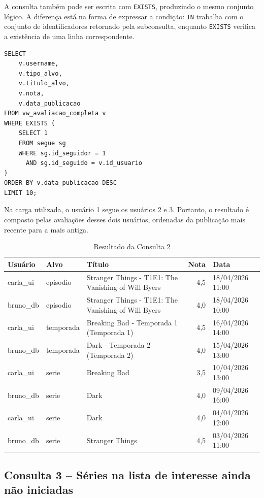 \documentclass[a4paper,12pt,oneside,openany]{book}
\newcommand{\id}[1]{\texttt{#1}}
\begin{document}
A consulta também pode ser escrita com \id{EXISTS}, produzindo o mesmo conjunto
lógico. A diferença está na forma de expressar a condição: \id{IN} trabalha
com o conjunto de identificadores retornado pela subconsulta, enquanto
\id{EXISTS} verifica a existência de uma linha correspondente.

\begin{lstlisting}[caption={Formulação equivalente da Consulta 2 com \id{EXISTS}},label={lst:consulta2-exists}]
SELECT
    v.username,
    v.tipo_alvo,
    v.titulo_alvo,
    v.nota,
    v.data_publicacao
FROM vw_avaliacao_completa v
WHERE EXISTS (
    SELECT 1
    FROM segue sg
    WHERE sg.id_seguidor = 1
      AND sg.id_seguido = v.id_usuario
)
ORDER BY v.data_publicacao DESC
LIMIT 10;
\end{lstlisting}

Na carga utilizada, o usuário 1 segue os usuários 2 e 3. Portanto, o resultado
é composto pelas avaliações desses dois usuários, ordenadas da publicação mais
recente para a mais antiga.

\begin{table}[H]
\centering
\caption{Resultado da Consulta 2}
\label{tab:resultado-consulta2}
\scriptsize
\begin{tabularx}{\textwidth}{@{}l l X r l@{}}
\toprule
\textbf{Usuário} & \textbf{Alvo} & \textbf{Título} & \textbf{Nota} & \textbf{Data} \\
\midrule
carla\_ui & episodio & Stranger Things - T1E1: The Vanishing of Will Byers & 4,5 & 18/04/2026 11:00 \\
bruno\_db & episodio & Stranger Things - T1E1: The Vanishing of Will Byers & 4,0 & 18/04/2026 10:00 \\
carla\_ui & temporada & Breaking Bad - Temporada 1 (Temporada 1) & 4,5 & 16/04/2026 14:00 \\
bruno\_db & temporada & Dark - Temporada 2 (Temporada 2) & 4,0 & 15/04/2026 13:00 \\
carla\_ui & serie & Breaking Bad & 3,5 & 10/04/2026 13:00 \\
bruno\_db & serie & Dark & 4,0 & 09/04/2026 16:00 \\
carla\_ui & serie & Dark & 4,0 & 04/04/2026 12:00 \\
bruno\_db & serie & Stranger Things & 4,5 & 03/04/2026 11:00 \\
\bottomrule
\end{tabularx}
\end{table}

\subsection{Consulta 3 -- Séries na lista de interesse ainda não iniciadas}
\end{document}
